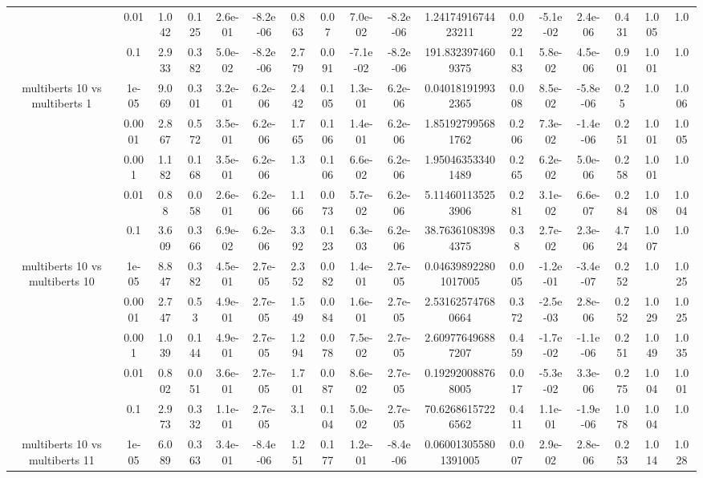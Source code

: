 \begin{tabular}{|c|c|c|c|c|c|c|c|c|c|c|c|c|c|c|c|c|}
 & 0.01 & 1.042 & 0.125 & 2.6e-01 & -8.2e-06 & 0.863 & 0.07 & 7.0e-02 & -8.2e-06 & 1.2417491674423211 & 0.022 & -5.1e-02 & 2.4e-06 & 0.431 & 1.005 & 1.0 \\
 & 0.1 & 2.933 & 0.382 & 5.0e-02 & -8.2e-06 & 2.779 & 0.091 & -7.1e-02 & -8.2e-06 & 191.8323974609375 & 0.183 & 5.8e-02 & 4.5e-06 & 0.901 & 1.001 & 1.0 \\
\hline
\multirow{5}{*}{multiberts 10 vs multiberts 1} & 1e-05 & 9.069 & 0.301 & 3.2e-01 & 6.2e-06 & 2.442 & 0.105 & 1.3e-01 & 6.2e-06 & 0.040181919932365 & 0.008 & 8.5e-02 & -5.8e-06 & 0.25 & 1.0 & 1.006 \\
 & 0.0001 & 2.867 & 0.572 & 3.5e-01 & 6.2e-06 & 1.765 & 0.106 & 1.4e-01 & 6.2e-06 & 1.851927995681762 & 0.206 & 7.3e-02 & -1.4e-06 & 0.251 & 1.001 & 1.005 \\
 & 0.001 & 1.182 & 0.168 & 3.5e-01 & 6.2e-06 & 1.3 & 0.106 & 6.6e-02 & 6.2e-06 & 1.950463533401489 & 0.265 & 6.2e-02 & 5.0e-06 & 0.258 & 1.001 & 1.0 \\
 & 0.01 & 0.88 & 0.058 & 2.6e-01 & 6.2e-06 & 1.166 & 0.073 & 5.7e-02 & 6.2e-06 & 5.114601135253906 & 0.281 & 3.1e-02 & 6.6e-07 & 0.284 & 1.008 & 1.004 \\
 & 0.1 & 3.609 & 0.366 & 6.9e-02 & 6.2e-06 & 3.392 & 0.123 & 6.3e-03 & 6.2e-06 & 38.76361083984375 & 0.38 & 2.7e-02 & 2.3e-06 & 4.724 & 1.007 & 1.0 \\
\hline
\multirow{5}{*}{multiberts 10 vs multiberts 10} & 1e-05 & 8.847 & 0.382 & 4.5e-01 & 2.7e-05 & 2.352 & 0.082 & 1.4e-01 & 2.7e-05 & 0.046398922801017005 & 0.005 & -1.2e-01 & -3.4e-07 & 0.252 & 1.0 & 1.025 \\
 & 0.0001 & 2.747 & 0.53 & 4.9e-01 & 2.7e-05 & 1.549 & 0.084 & 1.6e-01 & 2.7e-05 & 2.531625747680664 & 0.372 & -2.5e-03 & 2.8e-06 & 0.252 & 1.029 & 1.025 \\
 & 0.001 & 1.039 & 0.144 & 4.9e-01 & 2.7e-05 & 1.294 & 0.078 & 7.5e-02 & 2.7e-05 & 2.609776496887207 & 0.459 & -1.7e-02 & -1.1e-06 & 0.251 & 1.049 & 1.035 \\
 & 0.01 & 0.802 & 0.051 & 3.6e-01 & 2.7e-05 & 1.701 & 0.087 & 8.6e-02 & 2.7e-05 & 0.192920088768005 & 0.017 & -5.3e-02 & 3.3e-06 & 0.275 & 1.004 & 1.001 \\
 & 0.1 & 2.973 & 0.332 & 1.1e-01 & 2.7e-05 & 3.1 & 0.104 & 5.0e-02 & 2.7e-05 & 70.62686157226562 & 0.411 & 1.1e-01 & -1.9e-06 & 1.078 & 1.004 & 1.0 \\
\hline
\multirow{5}{*}{multiberts 10 vs multiberts 11} & 1e-05 & 6.089 & 0.363 & 3.4e-01 & -8.4e-06 & 1.251 & 0.177 & 1.2e-01 & -8.4e-06 & 0.060013055801391005 & 0.007 & 2.9e-02 & 2.8e-06 & 0.253 & 1.014 & 1.028 \\

\end{tabular}
